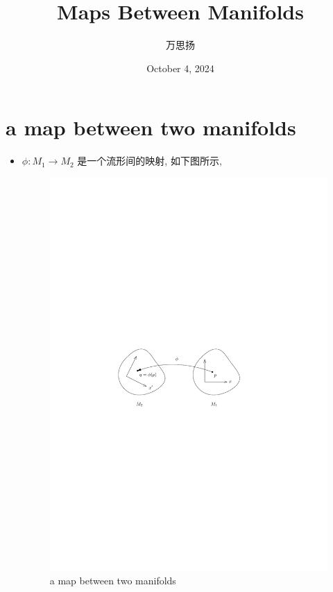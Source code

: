 \documentclass[10pt, a4paper]{article}
\title{\Huge \textbf{Maps Between Manifolds}}
\author{万思扬}
\date{October 4, 2024}
\numberwithin{equation}{section}
\begin{document}
	\maketitle
	
	\tableofcontents
	
	\section{a map between two manifolds}
	\begin{itemize}
		\item $\phi : M_1 \rightarrow M_2$ 是一个流形间的映射, 如下图所示,
		
		\begin{figure}[H]
			\centering
			\includegraphics[scale=1]{figures/a map between two manifolds.pdf}
			\caption{a map between two manifolds}
		\end{figure}
	\end{itemize}
	
\end{document}
